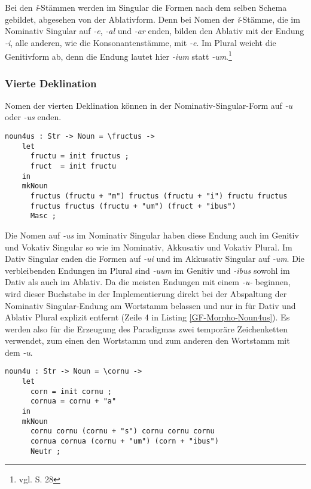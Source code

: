 Bei den \textit{ǐ}-Stämmen werden im Singular die Formen nach dem selben Schema gebildet, abgesehen von der Ablativform. Denn bei Nomen der \textit{ǐ}-Stämme, die im Nominativ Singular auf \textit{-e}, \textit{-al} und \textit{-ar} enden, bilden den Ablativ mit der Endung \textit{-i}, alle anderen, wie die Konsonantenstämme, mit \textit{-e}. Im Plural weicht die Genitivform ab, denn die Endung lautet hier \textit{-ium} statt \textit{-um}.\footnote{vgl. \cite{BAYER-LINDAUER1994} S. 28} \par
\FloatBarrier
\subsubsection{Vierte Deklination}
Nomen der vierten Deklination können in der Nominativ-Singular-Form auf \textit{-u} oder \textit{-us} enden. \par
\begin{lstlisting}[float=h!tp,caption={Die Deklinationsfunktionen für die Nomen der vierten Deklination auf \textit{-us}},label={GF-Morpho-Noun4us},basicstyle=\small]
  noun4us : Str -> Noun = \fructus -> 
    let
      fructu = init fructus ;
      fruct  = init fructu
    in
    mkNoun
      fructus (fructu + "m") fructus (fructu + "i") fructu fructus
      fructus fructus (fructu + "um") (fruct + "ibus")
      Masc ;
\end{lstlisting}
Die Nomen auf \textit{-us} im Nominativ Singular haben diese Endung auch im Genitiv und Vokativ Singular so wie im Nominativ, Akkusativ und Vokativ Plural. Im Dativ Singular enden die Formen auf \textit{-ui} und im Akkusativ Singular auf \textit{-um}. Die verbleibenden Endungen im Plural sind \textit{-uum} im Genitiv und \textit{-ibus} sowohl im Dativ als auch im Ablativ. Da die meisten Endungen mit einem \textit{-u-} beginnen, wird dieser Buchstabe in der Implementierung direkt bei der Abspaltung der Nominativ Singular-Endung am Wortstamm belassen und nur in für Dativ und Ablativ Plural explizit entfernt (Zeile 4 in Listing \ref{GF-Morpho-Noun4us}). Es werden also für die Erzeugung des Paradigmas zwei temporäre Zeichenketten verwendet, zum einen den Wortstamm und zum anderen den Wortstamm mit dem \textit{-u}. \par
\begin{lstlisting}[float=h!tp,caption={Die Deklinationsfunktionen für die Nomen der vierten Deklination auf \textit{-u}},label={GF-Morpho-Noun4u},basicstyle=\small]
  noun4u : Str -> Noun = \cornu -> 
    let
      corn = init cornu ;
      cornua = cornu + "a"
    in
    mkNoun
      cornu cornu (cornu + "s") cornu cornu cornu
      cornua cornua (cornu + "um") (corn + "ibus")
      Neutr ;
\end{lstlisting}
